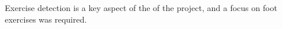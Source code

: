 
	
	Exercise detection is a key aspect of the of the project, and a focus on foot exercises was required. 